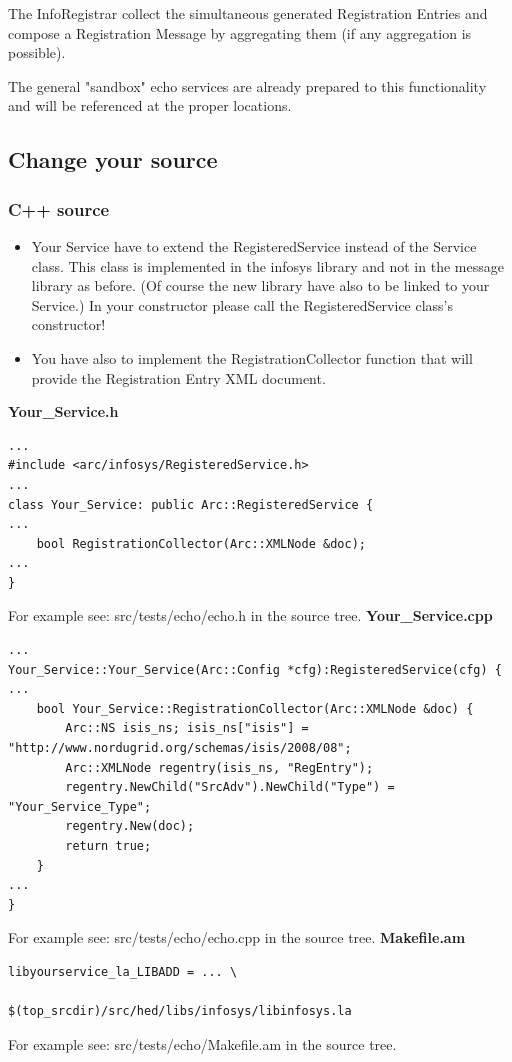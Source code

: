 The InfoRegistrar collect the simultaneous generated Registration Entries and compose a Registration Message by aggregating them (if any aggregation is possible).

The general "sandbox" echo services are already prepared to this functionality and will be referenced at the proper locations.

\subsection{Change your source}
\label{Change your source}

\subsubsection{C++ source}
\label{C++ source}
\begin{itemize}
\item Your Service have to extend the RegisteredService instead of the Service class. This class is implemented in the infosys library and not in the message library as before. (Of course the new library have also to be linked to your Service.)
In your constructor please call the RegisteredService class's constructor!
\item You have also to implement the RegistrationCollector function that will provide the Registration Entry XML document.
\end{itemize}
\textbf{Your\_Service.h}
\begin{verbatim}
...
#include <arc/infosys/RegisteredService.h>
...
class Your_Service: public Arc::RegisteredService {
...
    bool RegistrationCollector(Arc::XMLNode &doc);
...
}
\end{verbatim}
For example see: src/tests/echo/echo.h in the source tree.
\textbf{Your\_Service.cpp}
\begin{verbatim}
...
Your_Service::Your_Service(Arc::Config *cfg):RegisteredService(cfg) {
...
    bool Your_Service::RegistrationCollector(Arc::XMLNode &doc) {
        Arc::NS isis_ns; isis_ns["isis"] = "http://www.nordugrid.org/schemas/isis/2008/08";
        Arc::XMLNode regentry(isis_ns, "RegEntry");
        regentry.NewChild("SrcAdv").NewChild("Type") = "Your_Service_Type";
        regentry.New(doc);
        return true;
    }
...
}
\end{verbatim}
For example see: src/tests/echo/echo.cpp in the source tree.
\textbf{Makefile.am}
\begin{verbatim}
libyourservice_la_LIBADD = ... \
                           $(top_srcdir)/src/hed/libs/infosys/libinfosys.la
\end{verbatim}
For example see: src/tests/echo/Makefile.am in the source tree.

